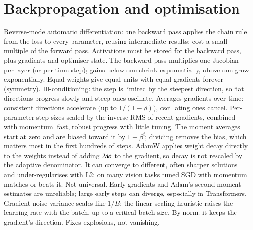 \section{Backpropagation and optimisation}
\begin{rapid}
	 Reverse-mode automatic differentiation: one backward pass applies the chain rule from the
	loss to every parameter, reusing intermediate results; cost a small multiple of the forward pass.
	 Activations must be stored for the backward pass, plus gradients and
	optimiser state.
	 The backward pass multiplies one Jacobian per layer (or per time step);
	gains below one shrink exponentially, above one grow exponentially.
	 Equal weights give equal units with equal gradients forever (symmetry).
	 Ill-conditioning: the step is limited by the steepest direction, so flat
	directions progress slowly and steep ones oscillate.
	 Averages gradients over time: consistent directions accelerate (up to $1/(1-\beta)$), oscillating
	ones cancel.
	 Per-parameter step sizes scaled by the inverse RMS of recent gradients, combined with
	momentum: fast, robust progress with little tuning.
	 The moment averages start at zero and are biased toward it by $1-\beta^t$; dividing
	removes the bias, which matters most in the first hundreds of steps.
	 AdamW applies weight decay directly to the weights instead of adding $\lambda{\bm{w}}$ to the gradient, so
	decay is not rescaled by the adaptive denominator.
	 It can converge to different, often sharper solutions and under-regularises
	with L2; on many vision tasks tuned SGD with momentum matches or beats it. Not universal.
	 Early gradients and Adam's second-moment estimates are unreliable; large early steps can
	diverge, especially in Transformers.
	 Gradient noise variance scales like $1/B$; the linear scaling heuristic raises the learning
	rate with the batch, up to a critical batch size.
	 By norm: it keeps the gradient's direction. Fixes explosions, not vanishing.
\end{rapid}

